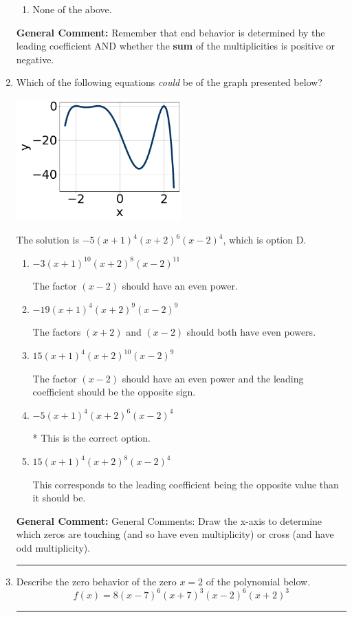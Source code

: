 \documentclass{extbook}[14pt]
\newcommand{\litem}[1]{\item #1

\rule{\textwidth}{0.4pt}}
\begin{document}
\begin{enumerate}
{\begin{enumerate}[label=\Alph*.]
\begin{multicols}{2}
\end{multicols}\item None of the above.\end{enumerate}
\textbf{General Comment:} Remember that end behavior is determined by the leading coefficient AND whether the \textbf{sum} of the multiplicities is positive or negative.
}
\litem{
Which of the following equations \textit{could} be of the graph presented below?

\begin{center}
    \includegraphics[width=0.5\textwidth]{../Figures/polyGraphToFunctionB.png}
\end{center}




The solution is \( -5(x + 1)^{4} (x + 2)^{6} (x - 2)^{4} \), which is option D.\begin{enumerate}[label=\Alph*.]
\item \( -3(x + 1)^{10} (x + 2)^{8} (x - 2)^{11} \)

The factor $(x - 2)$ should have an even power.
\item \( -19(x + 1)^{4} (x + 2)^{9} (x - 2)^{9} \)

The factors $(x + 2)$ and $(x - 2)$ should both have even powers.
\item \( 15(x + 1)^{4} (x + 2)^{10} (x - 2)^{9} \)

The factor $(x - 2)$ should have an even power and the leading coefficient should be the opposite sign.
\item \( -5(x + 1)^{4} (x + 2)^{6} (x - 2)^{4} \)

* This is the correct option.
\item \( 15(x + 1)^{4} (x + 2)^{8} (x - 2)^{4} \)

This corresponds to the leading coefficient being the opposite value than it should be.
\end{enumerate}

\textbf{General Comment:} General Comments: Draw the x-axis to determine which zeros are touching (and so have even multiplicity) or cross (and have odd multiplicity).
}
\litem{
Describe the zero behavior of the zero $x = 2$ of the polynomial below.
\[ f(x) = 8(x - 7)^{6}(x + 7)^{3}(x - 2)^{6}(x + 2)^{3} \]

}
\end{enumerate}
\end{document}
